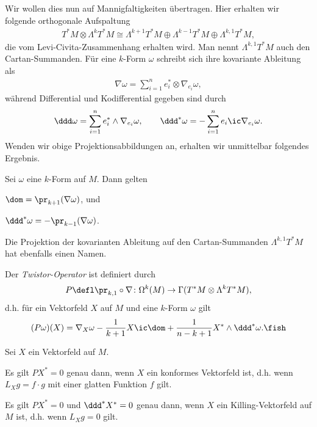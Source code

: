 \documentclass[%
	paper=a5,%
	fleqn,%
	DIV=18,%
	BCOR=0mm,
	fontsize=11pt,
	titlepage=false,%
	bibliography=totoc,
	DIV=18,%
	twoside=true,
	pdftitle=Riemannsche Geometrie,
	pdfauthor=Uwe Semmelmann,
	numbers=noendperiod]%
	{scrbook}
\begin{document}
Wir wollen dies nun auf Mannigfaltigkeiten übertragen. Hier erhalten wir folgende orthogonale Aufspaltung
\begin{align*}
T^*M \otimes \Lambda^k T^*M \cong \Lambda^{k+1}T^*M \oplus \Lambda^{k-1}T^*M \oplus \Lambda^{k,1}T^*M,
\end{align*}
die vom Levi-Civita-Zusammenhang erhalten wird. Man nennt $\Lambda^{k,1}T^*M$ auch den Cartan-Summanden. Für eine $k$-Form $\omega$ schreibt sich ihre kovariante Ableitung als
\begin{align*}
\nabla \omega = \sum_{i=1}^n e_{i}^* \otimes \nabla_{e_{i}}\omega,
\end{align*}
während Differential und Kodifferential gegeben sind durch
\begin{align*}
\ddd \omega = \sum_{i=1}^n e_{i}^* \wedge \nabla_{e_{i}}\omega,\qquad
\ddd^* \omega = -\sum_{i=1}^n e_{i} \ic \nabla_{e_{i}}\omega.
\end{align*}
Wenden wir obige Projektionsabbildungen an, erhalten wir unmittelbar folgendes Ergebnis.

\begin{lem}
Sei $\omega$ eine $k$-Form auf $M$. Dann gelten
\begin{propenum}
\item $\dom = \pr_{k+1}(\nabla \omega)$, und
\item $\ddd^*\omega = -\pr_{k-1}(\nabla \omega)$.\fish
\end{propenum}
\end{lem}

Die Projektion der kovarianten Ableitung auf den Cartan-Summanden $\Lambda^{k,1}T^*M$ hat ebenfalls einen Namen.

\begin{defn}
Der \emph{Twistor-Operator} ist definiert durch
\begin{align*}
P\defl \pr_{k,1}\circ \nabla \colon \Omega^k(M)\to \Gamma(T^*M\otimes \Lambda^k T^*M),
\end{align*}
d.h. für ein Vektorfeld $X$ auf $M$ und eine $k$-Form $\omega$ gilt
\begin{align*}
(P\omega)(X) = \nabla_{X}\omega - \frac{1}{k+1}X \ic \dom + \frac{1}{n-k+1} X^*\wedge \ddd^*\omega.\fish
\end{align*}
\end{defn}

\begin{lem}
\label{lem:Killing-Twistor}
Sei $X$ ein Vektorfeld auf $M$.
\begin{propenum}
\item Es gilt $PX^* = 0$ genau dann, wenn $X$ ein konformes Vektorfeld ist, d.h. wenn $L_{X}g = f\cdot g$ mit einer glatten Funktion $f$ gilt.
\item Es gilt $PX^* = 0$ und $\ddd^* X^* = 0$ genau dann, wenn $X$ ein Killing-Vektorfeld auf $M$ ist, d.h. wenn $L_{X}g = 0$ gilt.\fish
\end{propenum}
\end{lem}
\end{document}
